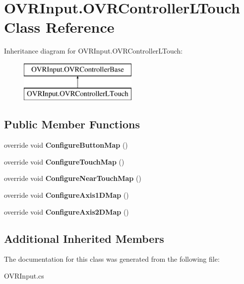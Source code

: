 \hypertarget{class_o_v_r_input_1_1_o_v_r_controller_l_touch}{}\section{O\+V\+R\+Input.\+O\+V\+R\+Controller\+L\+Touch Class Reference}
\label{class_o_v_r_input_1_1_o_v_r_controller_l_touch}
Inheritance diagram for O\+V\+R\+Input.\+O\+V\+R\+Controller\+L\+Touch\+:\begin{figure}[H]
\begin{center}
\leavevmode
\includegraphics[height=2.000000cm]{class_o_v_r_input_1_1_o_v_r_controller_l_touch}
\end{center}
\end{figure}
\subsection*{Public Member Functions}
\begin{DoxyCompactItemize}
\item 
\mbox{\label{class_o_v_r_input_1_1_o_v_r_controller_l_touch_a46f8f15e5854a6a1122fc23c13708914}} 
override void {\bfseries Configure\+Button\+Map} ()
\item 
\mbox{\label{class_o_v_r_input_1_1_o_v_r_controller_l_touch_a5c4d54f41edab5943579c3f184c1d9a0}} 
override void {\bfseries Configure\+Touch\+Map} ()
\item 
\mbox{\label{class_o_v_r_input_1_1_o_v_r_controller_l_touch_aebc9d92000ff6b903183603fa22d05b4}} 
override void {\bfseries Configure\+Near\+Touch\+Map} ()
\item 
\mbox{\label{class_o_v_r_input_1_1_o_v_r_controller_l_touch_a3b403142a71304014a8394a7f27c0208}} 
override void {\bfseries Configure\+Axis1\+D\+Map} ()
\item 
\mbox{\label{class_o_v_r_input_1_1_o_v_r_controller_l_touch_ad3e6894b63fa98c65631ee636f1b6a23}} 
override void {\bfseries Configure\+Axis2\+D\+Map} ()
\end{DoxyCompactItemize}
\subsection*{Additional Inherited Members}


The documentation for this class was generated from the following file\+:\begin{DoxyCompactItemize}
\item 
O\+V\+R\+Input.\+cs\end{DoxyCompactItemize}
